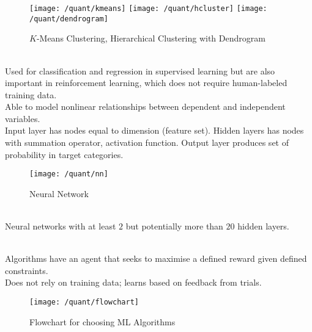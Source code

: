 \begin{figure}[H]
\centering
\texttt{[image: /quant/kmeans]}
\texttt{[image: /quant/hcluster]}
\texttt{[image: /quant/dendrogram]}
\caption{$K$-Means Clustering, Hierarchical Clustering with Dendrogram}
\end{figure}

\begin{definition} \\
Used for classification and regression in supervised learning but are also important in reinforcement learning, which does not require human-labeled training data.\\
Able to model nonlinear relationships between dependent and independent variables.\\
Input layer has nodes equal to dimension (feature set). Hidden layers has nodes with summation operator, activation function. Output layer produces set of probability in target categories. 
\end{definition}

\begin{figure}[H]
\centering
\texttt{[image: /quant/nn]}
\caption{Neural Network}
\end{figure}

\begin{definition} \\
Neural networks with at least $2$ but potentially more than $20$ hidden layers.
\end{definition}

\begin{definition} \\
Algorithms have an agent that seeks to maximise a defined reward given defined constraints.\\
Does not rely on training data; learns based on feedback from trials. 
\end{definition}

\begin{figure}[H]
\centering
\texttt{[image: /quant/flowchart]}
\caption{Flowchart for choosing ML Algorithms}
\end{figure}
